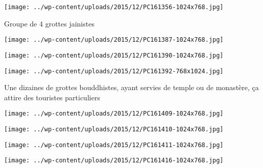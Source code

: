  

\begin{center} \texttt{[image: ../wp-content/uploads/2015/12/PC161356-1024x768.jpg]} \end{center}

 

 Groupe de 4 grottes jainistes 

 

\begin{center} \texttt{[image: ../wp-content/uploads/2015/12/PC161387-1024x768.jpg]} \end{center}

 

 

\begin{center} \texttt{[image: ../wp-content/uploads/2015/12/PC161390-1024x768.jpg]} \end{center}

 

 

\begin{center} \texttt{[image: ../wp-content/uploads/2015/12/PC161392-768x1024.jpg]} \end{center}

 

 Une dizaines de grottes bouddhistes, ayant servies de temple ou de monastère, ça attire des touristes particuliers 

 

\begin{center} \texttt{[image: ../wp-content/uploads/2015/12/PC161409-1024x768.jpg]} \end{center}

 

 

\begin{center} \texttt{[image: ../wp-content/uploads/2015/12/PC161410-1024x768.jpg]} \end{center}

 

 

\begin{center} \texttt{[image: ../wp-content/uploads/2015/12/PC161411-1024x768.jpg]} \end{center}

 

 

\begin{center} \texttt{[image: ../wp-content/uploads/2015/12/PC161416-1024x768.jpg]} \end{center}

